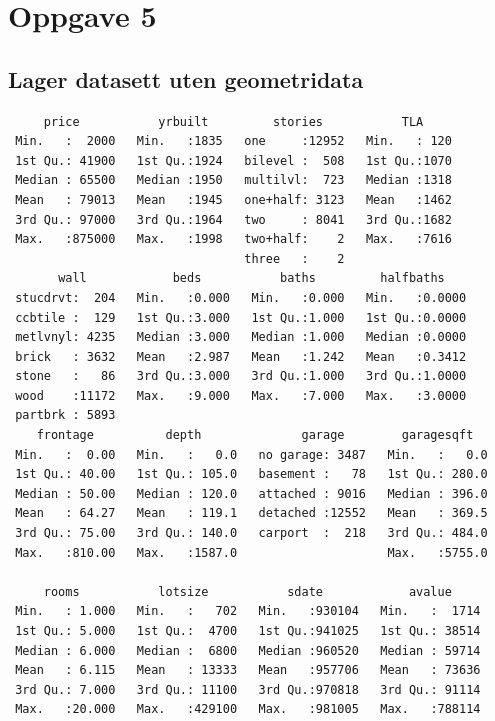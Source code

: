 \documentclass[
  norsk,
  a4paper,
]{article}
\begin{document}
\section{Oppgave 5}\label{oppgave-5}

\subsection{Lager datasett uten
geometridata}\label{lager-datasett-uten-geometridata}

\begin{verbatim}
     price           yrbuilt         stories           TLA      
 Min.   :  2000   Min.   :1835   one     :12952   Min.   : 120  
 1st Qu.: 41900   1st Qu.:1924   bilevel :  508   1st Qu.:1070  
 Median : 65500   Median :1950   multilvl:  723   Median :1318  
 Mean   : 79013   Mean   :1945   one+half: 3123   Mean   :1462  
 3rd Qu.: 97000   3rd Qu.:1964   two     : 8041   3rd Qu.:1682  
 Max.   :875000   Max.   :1998   two+half:    2   Max.   :7616  
                                 three   :    2                 
       wall            beds           baths         halfbaths     
 stucdrvt:  204   Min.   :0.000   Min.   :0.000   Min.   :0.0000  
 ccbtile :  129   1st Qu.:3.000   1st Qu.:1.000   1st Qu.:0.0000  
 metlvnyl: 4235   Median :3.000   Median :1.000   Median :0.0000  
 brick   : 3632   Mean   :2.987   Mean   :1.242   Mean   :0.3412  
 stone   :   86   3rd Qu.:3.000   3rd Qu.:1.000   3rd Qu.:1.0000  
 wood    :11172   Max.   :9.000   Max.   :7.000   Max.   :3.0000  
 partbrk : 5893                                                   
    frontage          depth              garage        garagesqft    
 Min.   :  0.00   Min.   :   0.0   no garage: 3487   Min.   :   0.0  
 1st Qu.: 40.00   1st Qu.: 105.0   basement :   78   1st Qu.: 280.0  
 Median : 50.00   Median : 120.0   attached : 9016   Median : 396.0  
 Mean   : 64.27   Mean   : 119.1   detached :12552   Mean   : 369.5  
 3rd Qu.: 75.00   3rd Qu.: 140.0   carport  :  218   3rd Qu.: 484.0  
 Max.   :810.00   Max.   :1587.0                     Max.   :5755.0  
                                                                     
     rooms           lotsize           sdate            avalue      
 Min.   : 1.000   Min.   :   702   Min.   :930104   Min.   :  1714  
 1st Qu.: 5.000   1st Qu.:  4700   1st Qu.:941025   1st Qu.: 38514  
 Median : 6.000   Median :  6800   Median :960520   Median : 59714  
 Mean   : 6.115   Mean   : 13333   Mean   :957706   Mean   : 73636  
 3rd Qu.: 7.000   3rd Qu.: 11100   3rd Qu.:970818   3rd Qu.: 91114  
 Max.   :20.000   Max.   :429100   Max.   :981005   Max.   :788114  
                                                                    

\end{verbatim}
\end{document}
